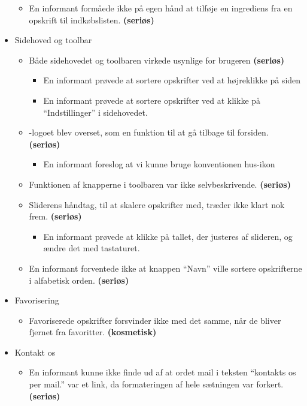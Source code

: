 \begin{itemize}[noitemsep]
   \begin{itemize}[noitemsep]
  \item En informant formåede ikke på egen hånd at tilføje en ingrediens fra en opskrift til indkøbslisten. \textbf{(seriøs)}
  \end{itemize}
 \item Sidehoved og toolbar
  \begin{itemize}[noitemsep]
  \item Både sidehovedet og toolbaren virkede usynlige for brugeren \textbf{(seriøs)}
   \begin{itemize}[noitemsep]
   \item En informant prøvede at sortere opskrifter ved at højreklikke på siden
   \item En informant prøvede at sortere opskrifter ved at klikke på ``Indstillinger'' i sidehovedet.
   \end{itemize}
  \item \Foodl-logoet blev overset, som en funktion til at gå tilbage til forsiden. \textbf{(seriøs)}
   \begin{itemize}[noitemsep]
   \item En informant foreslog at vi kunne bruge konventionen hus-ikon
   \end{itemize}
  \item Funktionen af knapperne i toolbaren var ikke selvbeskrivende.  \textbf{(seriøs)}
  \item Sliderens håndtag, til at skalere opskrifter med, træder ikke klart nok frem. \textbf{(seriøs)}
   \begin{itemize}[noitemsep]
   \item En informant prøvede at klikke på tallet, der justeres af slideren, og ændre det med tastaturet.
   \end{itemize}
  \item En informant forventede ikke at knappen ``Navn'' ville sortere opskrifterne i alfabetisk orden. \textbf{(seriøs)}
  \end{itemize}
 \item Favorisering
  \begin{itemize}[noitemsep]
  \item Favoriserede opskrifter forsvinder ikke med det samme, når de bliver fjernet fra favoritter. \textbf{(kosmetisk)}
  \end{itemize}
 \item Kontakt os
  \begin{itemize}[noitemsep]
  \item En informant kunne ikke finde ud af at ordet mail i teksten ``kontakts os per mail.'' var et link, da formateringen af hele sætningen var forkert. \textbf{(seriøs)}
  \end{itemize}
\end{itemize}


